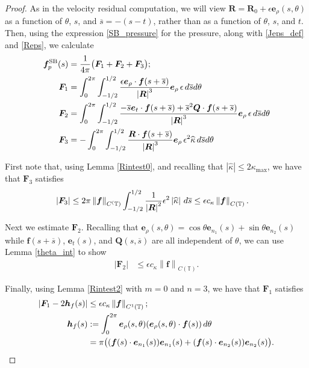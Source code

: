 \documentclass[11pt]{article}
\numberwithin{equation}{section}
\newcommand{\T}{\mathbb{T}}
\newcommand{\bars}{\overline s}
\newcommand{\be}{\bm{e}}
\newcommand{\ts}{\thinspace}
\newcommand{\SB}{{\rm SB}}
\newcommand{\abs}[1]{\left\lvert #1 \right\rvert}
\newcommand{\norm}[1]{\left\lVert #1 \right\rVert}
\newcommand{\wh}[1]{\widehat{#1}}
\theoremstyle{definition}
\begin{document}
\begin{proof}
 As in the velocity residual computation, we will view $\bm{R}=\bm{R}_0+\epsilon\be_\rho(s,\theta)$ as a function of $\theta$, $s$, and $\bars=-(s-t)$, rather than as a function of $\theta$, $s$, and $t$. Then, using the expression \eqref{SB_pressure} for the pressure, along with \eqref{Jeps_def} and \eqref{Reps}, we calculate
 \begin{equation}\label{fSBp}
\begin{aligned}
\bm{f}^{\SB}_p(s) &= \frac{1}{4\pi}\big(\bm{F}_1 +\bm{F}_2 +\bm{F}_3\big); \\
\bm{F}_1 &= \int_0^{2\pi}\int_{-1/2}^{1/2} \frac{\epsilon\be_{\rho}\cdot \bm{f}(s+\bars)}{\abs{\bm{R}}^3} \be_\rho \ts \epsilon \ts d\bars d\theta \\
\bm{F}_2 &= \int_0^{2\pi}\int_{-1/2}^{1/2} \frac{-\bars\be_t\cdot \bm{f}(s+\bars) + \bars^2\bm{Q}\cdot\bm{f}(s+\bars)}{\abs{\bm{R}}^3} \be_\rho \ts \epsilon\ts d\bars d\theta \\
\bm{F}_3 &= -\int_0^{2\pi}\int_{-1/2}^{1/2} \frac{\bm{R}\cdot \bm{f}(s+\bars)}{\abs{\bm{R}}^3} \be_\rho \ts \epsilon^2\wh\kappa \ts d\bars d\theta \\
\end{aligned}
\end{equation}

First note that, using Lemma \ref{Rintest0}, and recalling that $\abs{\wh\kappa}\le 2\kappa_{\max}$, we have that $\bm{F}_3$ satisfies 
\begin{align*}
\abs{\bm{F}_3} &\le 2\pi \norm{\bm{f}}_{C^(\T)} \int_{-1/2}^{1/2} \frac{1}{\abs{\bm{R}}^2} \epsilon^2\abs{\wh\kappa} \ts d\bars \le \epsilon c_\kappa \norm{\bm{f}}_{C(\T)}.
\end{align*}

Next we estimate $\bm{F}_2$. Recalling that $\be_{\rho}(s,\theta)= \cos\theta\be_{n_1}(s)+\sin\theta \be_{n_2}(s)$ while $\bm{f}(s+\bars)$, $\be_t(s)$, and $\bm{Q}(s,\bars)$ are all independent of $\theta$, we can use Lemma \ref{theta_int} to show 
\begin{align*}
\abs{\bm{F}_2} &\le \epsilon c_\kappa \norm{\bm{f}}_{C(\T)}.
\end{align*}

Finally, using Lemma \ref{Rintest2} with $m=0$ and $n=3$, we have that $\bm{F}_1$ satisfies
\begin{equation}\label{hf_def}
\begin{aligned}
\abs{\bm{F}_1 - 2\bm{h}_f(s)} &\le \epsilon c_\kappa\norm{\bm{f}}_{C^1(\T)}; \\
\bm{h}_f(s) &:= \int_0^{2\pi}\be_{\rho}(s,\theta)(\be_{\rho}(s,\theta)\cdot\bm{f}(s)) \ts d\theta \\
&= \pi \big((\bm{f}(s)\cdot\be_{n_1}(s))\be_{n_1}(s) + (\bm{f}(s)\cdot\be_{n_2}(s))\be_{n_2}(s) \big).
\end{aligned}
\end{equation}
 

\end{proof}
\end{document}

